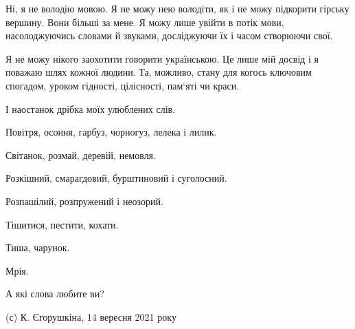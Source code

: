 Ні, я не володію мовою. Я не можу нею володіти, як і не можу підкорити гірську
вершину. Вони більші за мене. Я можу лише увійти в потік мови, насолоджуючись
словами й звуками, досліджуючи їх і часом створюючи свої.

Я не можу нікого заохотити говорити українською. Це лише мій досвід і я поважаю
шлях кожної людини. Та, можливо, стану для когось ключовим спогадом, уроком
гідності, цілісності, пам‘яті чи краси.

І наостанок дрібка моїх улюблених слів.

Повітря, осоння, гарбуз, чорногуз, лелека і лилик.

Світанок, розмай, деревій, немовля.

Розкішний, смарагдовий, бурштиновий і суголосний.

Розпашілий, розпружений і неозорий.

Тішитися, пестити, кохати.

Тиша, чарунок.

Мрія.

А які слова любите ви?

(с) К. Єгорушкіна, 14 вересня 2021 року


